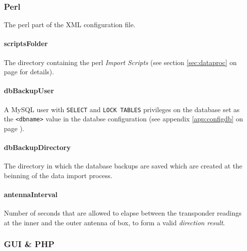 \documentclass[a4paper,10pt,twoside,headings=small,bibliography=totocnumbered,headsepline]{scrartcl}
\begin{document}
\begin{appendix}
\subsubsection{Perl}
\label{app:configperl}

The perl part of the XML configuration file.



\paragraph{scriptsFolder} The directory containing the perl \textit{Import Scripts} (see section \ref{sec:dataproc} on page \pageref{sec:dataproc} for details).

\paragraph{dbBackupUser} A MySQL user with \lstinline|SELECT| and \lstinline|LOCK TABLES| privileges on the database set as the \lstinline|<dbname>| value in the databse configuration (see appendix \ref{app:configdb} on page \pageref{app:configdb}). 

\paragraph{dbBackupDirectory} The directory in which the database backups are saved which are created at the beinning of the data import process.

\paragraph{antennaInterval}
\label{para:perl_antenna_interval}
Number of seconds that are allowed to elapse between the transponder readings at the inner and the outer antenna of box, to form a valid \textit{direction result}. 

\subsubsection{GUI \& PHP}
\label{app:configfrontend}





\end{appendix}
\end{document}
